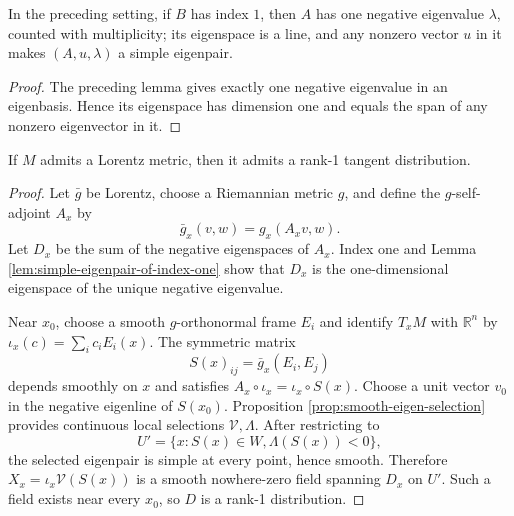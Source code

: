 \begin{lemma}
\label{lem:simple-eigenpair-of-index-one}
\leanok
{}
In the preceding setting, if $B$ has index $1$, then $A$ has one negative
eigenvalue $\lambda$, counted with multiplicity; its eigenspace is a line, and
any nonzero vector $u$ in it makes $(A,u,\lambda)$ a simple eigenpair.
\end{lemma}

\begin{proof}
\leanok
{}
\sketch The preceding lemma gives exactly one negative eigenvalue in an eigenbasis.
Hence its eigenspace has dimension one and equals the span of any nonzero
eigenvector in it.
\end{proof}

\begin{proposition}
\label{prop:rank-one-distribution-of-lorentz-metric}
\leanok
{}
If $M$ admits a Lorentz metric, then it admits a rank-1 tangent distribution.
\end{proposition}

\begin{proof}
\leanok
{}
\sketch Let $\bar g$ be Lorentz, choose a Riemannian metric $g$, and define the
$g$-self-adjoint $A_x$ by
\[
\bar g_x(v,w)=g_x(A_xv,w).
\]
Let $D_x$ be the sum of the negative eigenspaces of $A_x$. Index one and Lemma
\ref{lem:simple-eigenpair-of-index-one} show that $D_x$ is the one-dimensional
eigenspace of the unique negative eigenvalue.

Near $x_0$, choose a smooth $g$-orthonormal frame $E_i$ and identify $T_xM$ with
$\mathbb R^n$ by $\iota_x(c)=\sum_i c_iE_i(x)$. The symmetric matrix
\[
S(x)_{ij}=\bar g_x(E_i,E_j)
\]
depends smoothly on $x$ and satisfies
$A_x\circ\iota_x=\iota_x\circ S(x)$. Choose a unit vector $v_0$ in the negative
eigenline of $S(x_0)$. Proposition \ref{prop:smooth-eigen-selection} provides
continuous local selections $\mathcal V,\Lambda$. After restricting to
\[
U'=\{x:S(x)\in W, \Lambda(S(x))<0\},
\]
the selected eigenpair is simple at every point, hence smooth. Therefore
$X_x=\iota_x\mathcal V(S(x))$ is a smooth nowhere-zero field spanning $D_x$ on
$U'$. Such a field exists near every $x_0$, so $D$ is a rank-1 distribution.
\end{proof}

